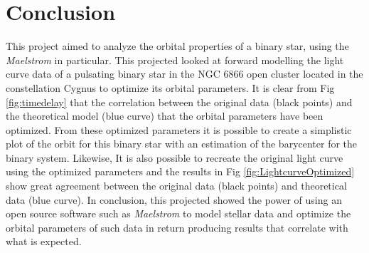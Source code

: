 \documentclass[]{article}
\begin{document}
\section{Conclusion}
This project aimed to analyze the orbital properties of a binary star, using the \textit{Maelstrom} in particular. This projected looked at forward modelling the light curve data of a pulsating binary star in the NGC 6866 open cluster located in the constellation Cygnus to optimize its orbital parameters. It is clear from Fig \ref{fig:timedelay} that the correlation between the original data (black points) and the theoretical model (blue curve) that the orbital parameters have been optimized. From these optimized parameters it is possible to create a simplistic plot of the orbit for this binary star with an estimation of the barycenter for the binary system. Likewise, It is also possible to recreate the original light curve using the optimized parameters and the results in Fig \ref{fig:LightcurveOptimized} show great agreement between the original data (black points) and theoretical data (blue curve). In conclusion, this projected showed the power of using an open source software such as \textit{Maelstrom} to model stellar data and optimize the orbital parameters of such data in return producing results that correlate with what is expected.

        
\end{document}
